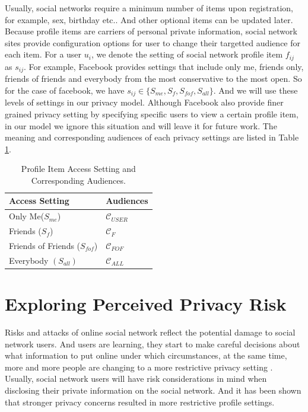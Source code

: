 \documentclass[a4paper]{article}
\begin{document}
Usually, social networks require a minimum number of items upon
registration, for example, sex, birthday etc.. And other optional
items can be updated later. Because profile items are carriers of
personal private information, social network sites provide
configuration options for user to change their targetted audience for
each item. For a user $u_i$, we denote the setting of social network
profile item $f_{ij}$ as $s_{ij}$. For example, Facebook provides
settings that include only me, friends only, friends of friends and
everybody from the most conservative to the most open. So for the case
of facebook, we have $s_{ij}\in \{S_{me},S_f,S_{fof},S_{all}\}$. And
we will use these levels of settings in our privacy model.
Although Facebook also provide finer grained privacy setting by
specifying specific users to view a certain profile item, in our model
we ignore this situation and will leave it for future work. The
meaning and corresponding audiences of each privacy settings are
listed in Table \ref{tbl:setting}.

\begin{table}[h]
  \centering
  \begin{tabular}{l|l}
    \toprule
    \textbf{Access Setting} & \textbf{Audiences} \\ \toprule
    Only Me($S_{me}$) & $\mathcal{C}_{USER}$\\ \midrule
    Friends ($S_f$) & $\mathcal{C}_F$ \\ \midrule
    Friends of Friends ($S_{fof}$) & $\mathcal{C}_{FOF}$ \\ \midrule
    Everybody $(S_{all})$ & $\mathcal{C}_{ALL}$ \\ \bottomrule
  \end{tabular}
  \caption{Profile Item Access Setting and Corresponding Audiences.}
  \label{tbl:setting}
\end{table}

\section{Exploring Perceived Privacy Risk}
Risks and attacks of online social network reflect the potential
damage to social network users. And users are learning, they start to
make careful decisions about what information to put online under
which circumstances, at the same time, more and more people are
changing to a more restrictive privacy setting
\cite{socialnet:setting}. 
Usually, social network users will have risk considerations in
mind when disclosing their private information
on the social network. And it has been shown
\cite{privacy:paradox:revisit} that stronger privacy
concerns resulted in more restrictive profile settings.
\end{document}
